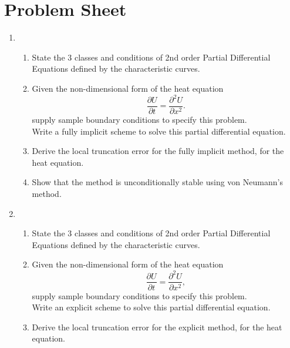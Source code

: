 \newpage
\chapter{Problem Sheet}
\begin{enumerate}

\item

	\begin{enumerate}
		\item
		State the 3 classes and conditions of 2nd order Partial Differential Equations defined by the characteristic curves.
		
		\item
		Given the non-dimensional form of the heat equation
		\[\frac{\partial U}{\partial t} = \frac{\partial^2 U}{\partial x^2}.\]
		supply sample boundary conditions to specify this problem.\\
		Write a fully implicit scheme to solve this partial differential equation.
		\item
		Derive the local truncation error for the fully implicit method, for the heat equation.
		\item
		Show that the method is unconditionally stable using von Neumann's method.
		

	\end{enumerate}

\item

	\begin{enumerate}
		\item
		State the 3 classes and conditions of 2nd order Partial Differential Equations defined by the characteristic curves.
		\item
		Given the non-dimensional form of the heat equation
		\[\frac{\partial U}{\partial t} = \frac{\partial^2 U}{\partial x^2},\]
		supply sample boundary conditions to specify this problem.\\
		Write an explicit scheme to solve this partial differential equation.
		\item
		Derive the local truncation error for the explicit method, for the heat equation.\\
						

\end{enumerate}
\end{enumerate}
